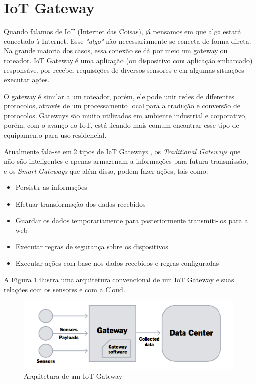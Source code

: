 \section{IoT Gateway}
\label{sec:iotGateway}

Quando falamos de IoT (Internet das Coisas), já pensamos em que algo estará conectado à Internet. Esse \textit{"algo"}  não necessariamente se conecta de forma direta. Na grande maioria dos casos, essa conexão se dá por meio um gateway ou roteador. IoT Gateway é uma aplicação (ou dispositivo com aplicação embarcado) responsável por receber requisições de diversos sensores e em algumas situações executar ações. \cite{ChenJiaLi}

O gateway é similar a um roteador, porém, ele pode unir redes de diferentes protocolos, através de um processamento local para a tradução e conversão de protocolos. Gateways são muito utilizados em ambiente industrial e corporativo, porém, com o avanço do IoT, está ficando mais comum encontrar esse tipo de equipamento para uso residencial.

Atualmente fala-se em 2 tipos de IoT Gateways \cite{WhatIsIotGateway}, os \textit{Traditional Gateways} que não são inteligentes e apenas armazenam a informações para futura transmissão, e os \textit{Smart Gateways} que além disso, podem fazer ações, tais como:
\begin{itemize}
	\item Persistir as informações
	\item Efetuar transformação dos dados recebidos
	\item Guardar os dados temporariamente para posteriormente transmiti-los para a web
	\item Executar regras de segurança sobre os dispositivos
	\item Executar ações com base nos dados recebidos e regras configuradas
\end{itemize}

A Figura \ref{fig:arquiteturaIotGateway} ilustra uma arquitetura convencional de um IoT Gateway e suas relações com os sensores e com a Cloud.
\begin{figure}[h!]
	\begin{center}
		\includegraphics[width=1\textwidth]{./img/rumFxS7.png}
		\caption{Arquitetura de um IoT Gateway}
		\label{fig:arquiteturaIotGateway}
	\end{center}
\end{figure}

